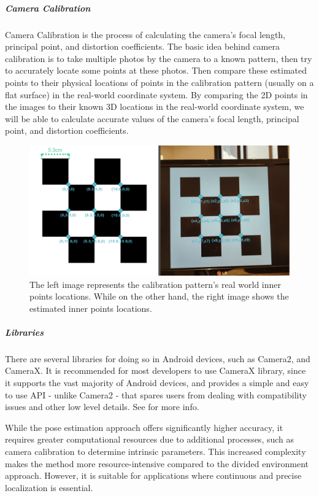 \subparagraph{Camera Calibration}
\label{Camera Calibration Background}
Camera Calibration is the process of calculating the camera's focal length, principal point, and distortion coefficients. The basic idea behind camera calibration is to take multiple photos by the camera to a known pattern, then try to accurately locate some points at these photos. Then compare these estimated points to their physical locations of points in the calibration pattern (usually on a flat surface) in the real-world coordinate system. By comparing the 2D points in the images to their known 3D locations in the real-world coordinate system, we will be able to calculate accurate values of the camera's focal length, principal point, and distortion coefficients.

\begin{figure}[h] %
	\centering
	\includegraphics[width=\textwidth]{assets/ch3/calibration illustration image/calibration illustration image.png}
	\caption{ The left image represents the calibration pattern's real world inner points locations. While on the other hand, the right image shows the estimated inner  points locations. }
	\label{Calibration_Illustrator}
\end{figure}

\subparagraph{Libraries}
\label{localization libraries BG}
There are several libraries for doing so in Android devices, such as Camera2, and CameraX. It is recommended for most developers to use CameraX library, since it supports the vast majority of Android devices, and provides a simple and easy to use API - unlike Camera2 - that spares users from dealing with compatibility issues and other low level details. See \cite{whichCameraLibToUse} for more info.


While the pose estimation approach offers significantly higher accuracy, it requires greater computational resources due to additional processes, such as camera calibration to determine intrinsic parameters. This increased complexity makes the method more resource-intensive compared to the divided environment approach. However, it is suitable for applications where continuous and precise localization is essential.




